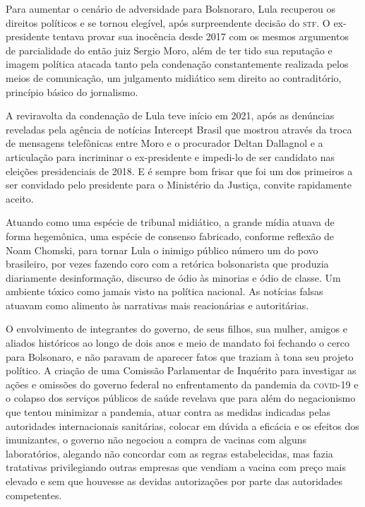 Para aumentar o cenário de adversidade para Bolsnoraro, Lula recuperou
os direitos políticos e se tornou elegível, após surpreendente decisão
do \textsc{stf}. O ex-presidente tentava provar sua inocência desde 2017 com os
mesmos argumentos de parcialidade do então juiz Sergio Moro, além de ter tido
sua reputação e imagem política atacada tanto pela condenação
constantemente realizada pelos meios de comunicação, um julgamento
midiático sem direito ao contraditório, princípio básico do jornalismo.

A reviravolta da condenação de Lula teve início em 2021, após as
denúncias reveladas pela agência de notícias Intercept Brasil que
mostrou através da troca de mensagens telefônicas entre Moro e o
procurador Deltan Dallagnol e a articulação para incriminar o
ex-presidente e impedi-lo de ser candidato nas eleições presidenciais de
2018. E é sempre bom frisar que foi um dos primeiros a ser convidado
pelo presidente para o Ministério da Justiça, convite rapidamente
aceito.

Atuando como uma espécie de tribunal midiático, a grande mídia atuava de
forma hegemônica, uma espécie de consenso fabricado, conforme reflexão
de Noam Chomski, para tornar Lula o inimigo público número um do povo
brasileiro, por vezes fazendo coro com a retórica bolsonarista que
produzia diariamente desinformação, discurso de ódio às minorias e ódio
de classe. Um ambiente tóxico como jamais visto na política nacional. As
notícias falsas atuavam como alimento às narrativas mais reacionárias e
autoritárias.

O envolvimento de integrantes do governo, de seus filhos, sua mulher,
amigos e aliados históricos ao longo de dois anos e meio de mandato foi
fechando o cerco para Bolsonaro, e não paravam de aparecer fatos que
traziam à tona seu projeto político. A criação de uma Comissão
Parlamentar de Inquérito para investigar as ações e omissões do governo
federal no enfrentamento da pandemia da \textsc{covid-19} e o colapso dos
serviços públicos de saúde revelava que para além do negacionismo que
tentou minimizar a pandemia, atuar contra as medidas indicadas pelas
autoridades internacionais sanitárias, colocar em dúvida a eficácia e os
efeitos dos imunizantes, o governo não negociou a compra de vacinas com
alguns laboratórios, alegando não concordar com as regras estabelecidas,
mas fazia tratativas privilegiando outras empresas que vendiam a vacina
com preço mais elevado e sem que houvesse as devidas autorizações por
parte das autoridades competentes.

